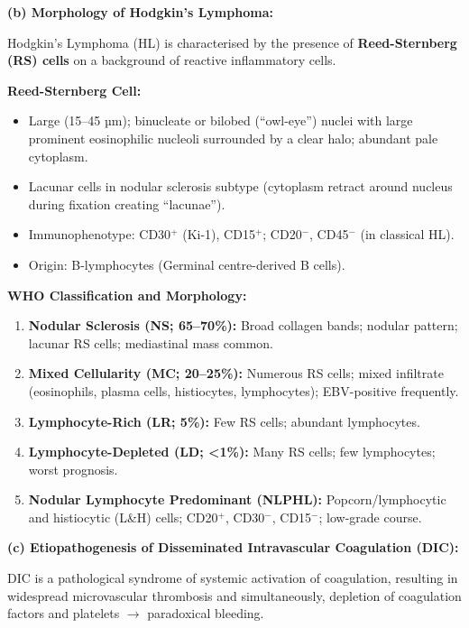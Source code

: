 \documentclass[11pt,a4paper]{article}
\begin{document}
\begin{ansbox}
\textbf{(b) Morphology of Hodgkin's Lymphoma:}

Hodgkin's Lymphoma (HL) is characterised by the presence of \textbf{Reed-Sternberg (RS) cells} on a background of reactive inflammatory cells.

\textbf{Reed-Sternberg Cell:}
\begin{itemize}[leftmargin=*]
    \item Large (15--45 µm); binucleate or bilobed (``owl-eye'') nuclei with large prominent eosinophilic nucleoli surrounded by a clear halo; abundant pale cytoplasm.
    \item Lacunar cells in nodular sclerosis subtype (cytoplasm retract around nucleus during fixation creating ``lacunae'').
    \item Immunophenotype: CD30$^+$ (Ki-1), CD15$^+$; CD20$^-$, CD45$^-$ (in classical HL).
    \item Origin: B-lymphocytes (Germinal centre-derived B cells).
\end{itemize}

\textbf{WHO Classification and Morphology:}
\begin{enumerate}[leftmargin=*]
    \item \textbf{Nodular Sclerosis (NS; 65--70\%):} Broad collagen bands; nodular pattern; lacunar RS cells; mediastinal mass common.
    \item \textbf{Mixed Cellularity (MC; 20--25\%):} Numerous RS cells; mixed infiltrate (eosinophils, plasma cells, histiocytes, lymphocytes); EBV-positive frequently.
    \item \textbf{Lymphocyte-Rich (LR; 5\%):} Few RS cells; abundant lymphocytes.
    \item \textbf{Lymphocyte-Depleted (LD; \textless{}1\%):} Many RS cells; few lymphocytes; worst prognosis.
    \item \textbf{Nodular Lymphocyte Predominant (NLPHL):} Popcorn/lymphocytic and histiocytic (L\&H) cells; CD20$^+$, CD30$^-$, CD15$^-$; low-grade course.
\end{enumerate}

\textbf{(c) Etiopathogenesis of Disseminated Intravascular Coagulation (DIC):}

DIC is a pathological syndrome of systemic activation of coagulation, resulting in widespread microvascular thrombosis and simultaneously, depletion of coagulation factors and platelets $\rightarrow$ paradoxical bleeding.


\end{ansbox}
\end{document}
